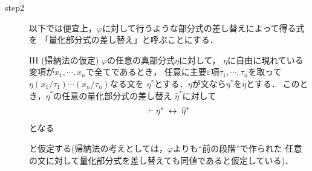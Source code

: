 \begin{sketch}
\begin{description}
				
			\item[step2]
				以下では便宜上，$\varphi$に対して行うような部分式の差し替えによって得る式を
				「量化部分式の差し替え」と呼ぶことにする．
				
				\begin{itembox}[l]{IH (帰納法の仮定)}
					$\varphi$の任意の真部分式$\eta$に対して，
					$\eta$に自由に現れている変項が$x_{1},\cdots,x_{n}$で全てであるとき，
					任意に主要$\varepsilon$項$\tau_{1},\cdots,\tau_{n}$を取って
					$\eta(x_{1}/\tau_{1})\cdots(x_{n}/\tau_{n})$なる文を
					$\eta^{*}$とする．$\eta$が文なら$\eta^{*}$を$\eta$とする．
					このとき，$\eta^{*}$の任意の量化部分式の差し替え
					$\widehat{\eta}^{*}$に対して
					\begin{align}
						\vdash \eta^{*} \hspace{0.25em}\leftrightarrow\hspace{0.25em} \widehat{\eta}^{*}
					\end{align}
					となる
				\end{itembox}
				と仮定する(帰納法の考えとしては，$\varphi$よりも``前の段階''で作られた
				任意の文に対して量化部分式を差し替えても同値であると仮定している)．
				

\end{description}
\end{sketch}
